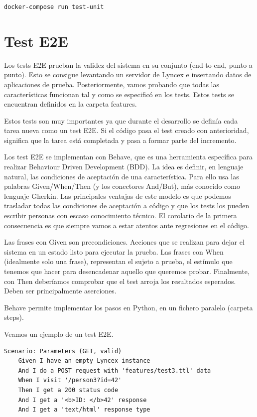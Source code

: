 \documentclass[12pt]{report} %
\begin{document}
\begin{verbatim}
docker-compose run test-unit
\end{verbatim}

\section{Test E2E}

Los tests E2E prueban la validez del sistema en su conjunto (end-to-end, punto a punto). Esto se consigue levantando un servidor de Lyncex e insertando datos de aplicaciones de prueba. Posteriormente, vamos probando que todas las características funcionan tal y como se especificó en los tests. Estos tests se encuentran definidos en la carpeta features.

Estos tests son muy importantes ya que durante el desarrollo se definía cada tarea nueva como un test E2E. Si el código pasa el test creado con anterioridad, significa que la tarea está completada y pasa a formar parte del incremento.

Los test E2E se implementan con Behave, que es una herramienta específica para realizar Behaviour Driven Development (BDD). La idea es definir, en lenguaje natural, las condiciones de aceptación de una característica. Para ello usa las palabras Given/When/Then (y los conectores And/But), más conocido como lenguaje Gherkin. Las principales ventajas de este modelo es que podemos trasladar todas las condiciones de aceptación a código y que los tests los pueden escribir personas con escaso conocimiento técnico. El corolario de la primera consecuencia es que siempre vamos a estar atentos ante regresiones en el código.

Las frases con Given son precondiciones. Acciones que se realizan para dejar el sistema en un estado listo para ejecutar la prueba. Las frases con When (idealmente solo una frase), representan el sujeto a prueba, el estímulo que tenemos que hacer para desencadenar aquello que queremos probar. Finalmente, con Then deberíamos comprobar que el test arroja los resultados esperados. Deben ser principalmente aserciones.

Behave permite implementar los pasos en Python, en un fichero paralelo (carpeta steps).

Veamos un ejemplo de un test E2E.

\begin{lstlisting}
Scenario: Parameters (GET, valid)
    Given I have an empty Lyncex instance
    And I do a POST request with 'features/test3.ttl' data
    When I visit '/person3?id=42'
    Then I get a 200 status code
    And I get a '<b>ID: </b>42' response
    And I get a 'text/html' response type
\end{lstlisting}
\end{document}

